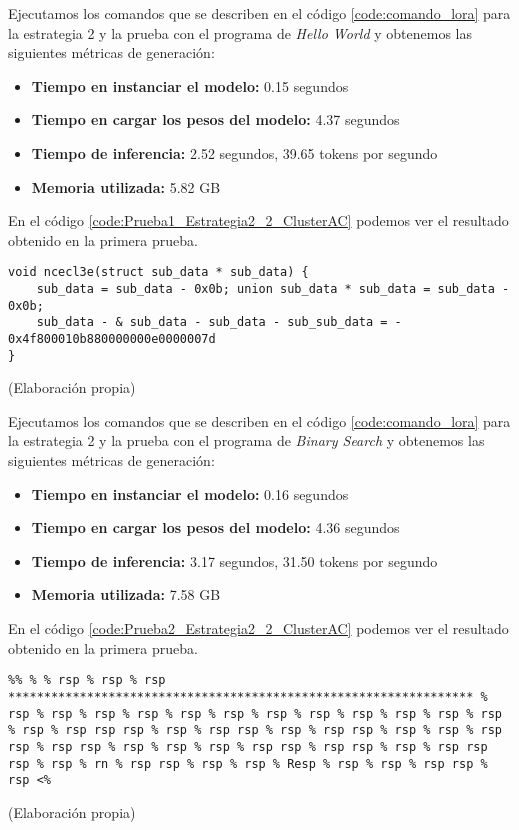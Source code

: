 Ejecutamos los comandos que se describen en el código \ref{code:comando_lora} para
la estrategia 2 y la prueba con el programa de \textit{Hello World} y obtenemos
las siguientes métricas de generación:

\begin{itemize}
    \item \textbf{Tiempo en instanciar el modelo:} 0.15 segundos
    \item \textbf{Tiempo en cargar los pesos del modelo:} 4.37 segundos
    \item \textbf{Tiempo de inferencia:} 2.52 segundos, 39.65 tokens por segundo
    \item \textbf{Memoria utilizada:} 5.82 GB
\end{itemize}

En el código \ref{code:Prueba1_Estrategia2_2_ClusterAC} podemos ver el resultado obtenido
en la primera prueba.

\begin{mycode}
    \begin{verbatim}
void ncecl3e(struct sub_data * sub_data) {
    sub_data = sub_data - 0x0b; union sub_data * sub_data = sub_data - 0x0b;
    sub_data - & sub_data - sub_data - sub_sub_data = - 0x4f800010b880000000e0000007d
}
    \end{verbatim}
    \caption[]{ (Elaboración propia)}
    \label{code:Prueba1_Estrategia2_2_ClusterAC}
\end{mycode}

Ejecutamos los comandos que se describen en el código \ref{code:comando_lora} para
la estrategia 2 y la prueba con el programa de \textit{Binary Search} y obtenemos
las siguientes métricas de generación:

\begin{itemize}
    \item \textbf{Tiempo en instanciar el modelo:} 0.16 segundos
    \item \textbf{Tiempo en cargar los pesos del modelo:} 4.36 segundos
    \item \textbf{Tiempo de inferencia:} 3.17 segundos, 31.50 tokens por segundo
    \item \textbf{Memoria utilizada:} 7.58 GB
\end{itemize}

En el código \ref{code:Prueba2_Estrategia2_2_ClusterAC} podemos ver el resultado obtenido
en la primera prueba.

\begin{mycode}
    \begin{verbatim}
%% % % rsp % rsp % rsp ***************************************************************** % rsp % rsp % rsp % rsp % rsp % rsp % rsp % rsp % rsp % rsp % rsp % rsp % rsp % rsp rsp rsp % rsp % rsp rsp % rsp % rsp rsp % rsp % rsp % rsp rsp % rsp rsp % rsp % rsp % rsp % rsp rsp % rsp rsp % rsp % rsp rsp rsp % rsp % rn % rsp rsp % rsp % rsp % Resp % rsp % rsp % rsp rsp % rsp <%
    \end{verbatim}
    \caption[]{ (Elaboración propia)}
    \label{code:Prueba2_Estrategia2_2_ClusterAC}
\end{mycode}

